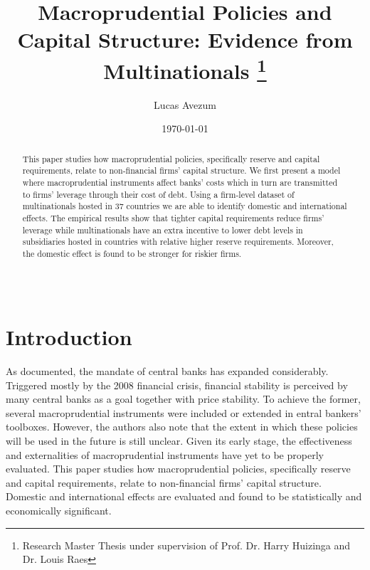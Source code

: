 \documentclass[12pt]{article}
\begin{document}
	
	\begin{titlepage}
		\title{Macroprudential Policies and Capital Structure: Evidence from Multinationals \thanks{Research Master Thesis under supervision of Prof. Dr. Harry Huizinga and Dr. Louis Raes}}
		\author{Lucas Avezum}
		\date{\today}
		\maketitle
		\begin{abstract}
			\noindent This paper studies how macroprudential policies, specifically reserve and capital requirements, relate to non-financial firms' capital structure. We first present a model where macroprudential instruments affect banks' costs which in turn are transmitted to firms' leverage through their cost of debt. Using a firm-level dataset of multinationals hosted in 37 countries we are able to identify domestic and international effects. The empirical results show that tighter capital requirements reduce firms' leverage while multinationals have an extra incentive to lower debt levels in subsidiaries hosted in countries with relative higher reserve requirements. Moreover, the domestic effect is found to be stronger for riskier firms.  \\
			\vspace{0in}\\
			\vspace{0in}\\
			
			\bigskip
		\end{abstract}
		\setcounter{page}{0}
		\thispagestyle{empty}
	\end{titlepage}
	\pagebreak \newpage
	
	
	
	
	\doublespacing
	
	
	\section{Introduction} \label{sec:introduction}
	As \cite*{NBERw22735} documented, the mandate of central banks has expanded considerably. Triggered mostly by the 2008 financial crisis, financial stability is perceived by many central banks as a goal together with price stability. To achieve the former, several macroprudential instruments were included or extended in entral bankers' toolboxes. However, the authors also note that the extent in which these policies will be used in the future is still unclear. Given its early stage, the effectiveness and externalities of macroprudential instruments have yet to be properly evaluated. This paper studies how macroprudential policies, specifically reserve and capital requirements, relate to non-financial firms' capital structure. Domestic and international effects are evaluated and found to be statistically and economically significant. 
	
\end{document}
